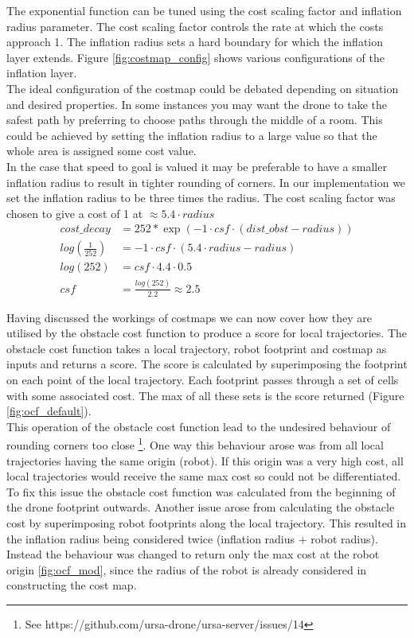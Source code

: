 \documentclass[capstone_report.tex]{subfiles}
\begin{document}
The exponential function can be tuned using the cost scaling factor and inflation radius parameter.  The cost scaling factor controls the rate at which the costs approach 1.  The inflation radius sets a hard boundary for which the inflation layer extends.  Figure \ref{fig:costmap_config} shows various configurations of the inflation layer.\\

The ideal configuration of the costmap could be debated depending on situation and desired properties.  In some instances you may want the drone to take the safest path by preferring to choose paths through the middle of a room.  This could be achieved by setting the inflation radius to a large value so that the whole area is assigned some cost value. \\

In the case that speed to goal is valued it may be preferable to have a smaller inflation radius to result in tighter rounding of corners.  In our implementation we set the inflation radius to be three times the radius.  The cost scaling factor was chosen to give a cost of 1 at $\approx 5.4\cdot radius$
\begin{align*}
    cost\_decay &= 252*\exp(-1 \cdot csf \cdot (dist\_obst - radius))\\
    log(\frac{1}{252}) &= -1 \cdot csf \cdot (5.4\cdot radius - radius)\\
    log(252) &= csf \cdot 4.4\cdot0.5\\
    csf &=    \frac{log(252)}{2.2}
        \approx 2.5
\end{align*}


Having discussed the workings of costmaps we can now cover how they are utilised by the obstacle cost function to produce a score for local trajectories. The obstacle cost function takes a local trajectory, robot footprint and costmap as inputs and returns a score.  The score is calculated by superimposing the footprint on each point of the local trajectory.  Each footprint passes through a set of cells with some associated cost.  The max of all these sets is the score returned (Figure \ref{fig:ocf_default}). \\

This operation of the obstacle cost function lead to the undesired behaviour of rounding corners too close \footnote{See https://github.com/ursa-drone/ursa-server/issues/14}.  One way this behaviour arose was from all local trajectories having the same origin (robot). If this origin was a very high cost, all local trajectories would receive the same max cost so could not be differentiated.  To fix this issue the obstacle cost function was calculated from the beginning of the drone footprint outwards.  Another issue arose from calculating the  obstacle cost by superimposing robot footprints along the local trajectory.  This resulted in the inflation radius being considered twice (inflation radius + robot radius).  Instead the behaviour was changed to return only the max cost at the robot origin \ref{fig:ocf_mod}, since the radius of the robot is already considered in constructing the cost map.
\end{document}
